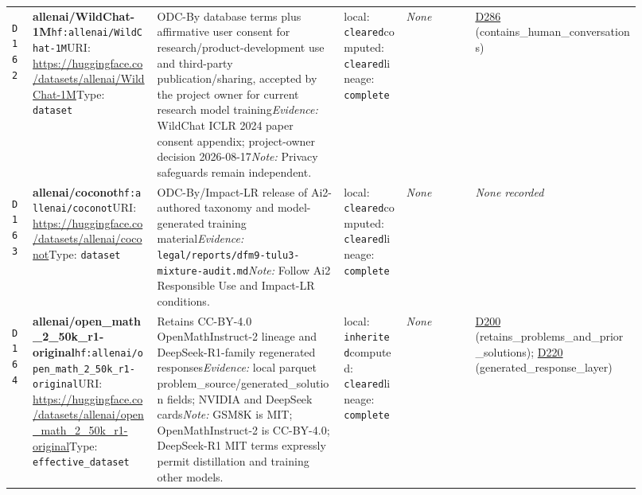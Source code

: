 \documentclass[9pt,a4paper]{article}
\newcommand{\depid}[1]{\hypertarget{dep:#1}{\texttt{#1}}}
\begin{document}
\begin{landscape}
\begin{longtable}{@{}L{0.035\linewidth}L{0.185\linewidth}L{0.27\linewidth}L{0.09\linewidth}L{0.10\linewidth}L{0.24\linewidth}@{}}
\depid{D162} & \textbf{allenai/WildChat-1M}\newline \nolinkurl{hf:allenai/WildChat-1M}\newline URI: \url{https://huggingface.co/datasets/allenai/WildChat-1M}\newline Type: \texttt{dataset} & ODC-By database terms plus affirmative user consent for research/product-development use and third-party publication/sharing, accepted by the project owner for current research model training\newline \textit{Evidence:} WildChat ICLR 2024 paper consent appendix; project-owner decision 2026-08-17\newline \textit{Note:} Privacy safeguards remain independent. & local: \texttt{cleared}\newline computed: \texttt{cleared}\newline lineage: \texttt{complete} & \textit{None} & \hyperlink{dep:D286}{D286} (contains\_human\_conversations) \\
\depid{D163} & \textbf{allenai/coconot}\newline \nolinkurl{hf:allenai/coconot}\newline URI: \url{https://huggingface.co/datasets/allenai/coconot}\newline Type: \texttt{dataset} & ODC-By/Impact-LR release of Ai2-authored taxonomy and model-generated training material\newline \textit{Evidence:} \nolinkurl{legal/reports/dfm9-tulu3-mixture-audit.md}\newline \textit{Note:} Follow Ai2 Responsible Use and Impact-LR conditions. & local: \texttt{cleared}\newline computed: \texttt{cleared}\newline lineage: \texttt{complete} & \textit{None} & \textit{None recorded} \\
\depid{D164} & \textbf{allenai/open\_math\_2\_50k\_r1-original}\newline \nolinkurl{hf:allenai/open_math_2_50k_r1-original}\newline URI: \url{https://huggingface.co/datasets/allenai/open_math_2_50k_r1-original}\newline Type: \texttt{effective\_dataset} & Retains CC-BY-4.0 OpenMathInstruct-2 lineage and DeepSeek-R1-family regenerated responses\newline \textit{Evidence:} local parquet problem\_source/generated\_solution fields; NVIDIA and DeepSeek cards\newline \textit{Note:} GSM8K is MIT; OpenMathInstruct-2 is CC-BY-4.0; DeepSeek-R1 MIT terms expressly permit distillation and training other models. & local: \texttt{inherited}\newline computed: \texttt{cleared}\newline lineage: \texttt{complete} & \textit{None} & \hyperlink{dep:D200}{D200} (retains\_problems\_and\_prior\_solutions); \hyperlink{dep:D220}{D220} (generated\_response\_layer) \\

\end{longtable}
\end{landscape}
\end{document}
